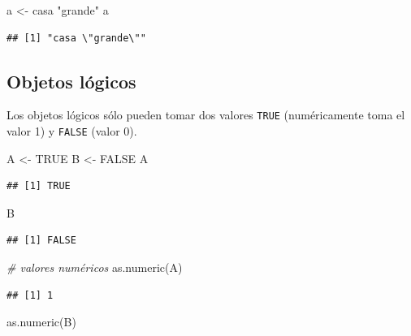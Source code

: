 \documentclass[
]{book}
\newenvironment{Shaded}{\begin{snugshade}}{\end{snugshade}}
\newcommand{\CommentTok}[1]{\textcolor[rgb]{0.56,0.35,0.01}{\textit{#1}}}
\newcommand{\ConstantTok}[1]{\textcolor[rgb]{0.00,0.00,0.00}{#1}}
\newcommand{\FunctionTok}[1]{\textcolor[rgb]{0.00,0.00,0.00}{#1}}
\newcommand{\NormalTok}[1]{#1}
\newcommand{\OtherTok}[1]{\textcolor[rgb]{0.56,0.35,0.01}{#1}}
\newcommand{\StringTok}[1]{\textcolor[rgb]{0.31,0.60,0.02}{#1}}
\theoremstyle{break}
\theoremstyle{nonumberplain}
\begin{document}
\begin{Shaded}
\begin{Highlighting}[]
\NormalTok{a }\OtherTok{\textless{}{-}} \StringTok{\textquotesingle{}casa "grande"\textquotesingle{}}
\NormalTok{a}
\end{Highlighting}
\end{Shaded}

\begin{verbatim}
## [1] "casa \"grande\""
\end{verbatim}

\hypertarget{objetos-luxf3gicos}{%
\subsection{Objetos lógicos}\label{objetos-luxf3gicos}}

Los objetos lógicos sólo pueden tomar dos valores \texttt{TRUE} (numéricamente toma el valor 1) y \texttt{FALSE}
(valor 0).

\begin{Shaded}
\begin{Highlighting}[]
\NormalTok{A }\OtherTok{\textless{}{-}} \ConstantTok{TRUE}
\NormalTok{B }\OtherTok{\textless{}{-}} \ConstantTok{FALSE}
\NormalTok{A}
\end{Highlighting}
\end{Shaded}

\begin{verbatim}
## [1] TRUE
\end{verbatim}

\begin{Shaded}
\begin{Highlighting}[]
\NormalTok{B}
\end{Highlighting}
\end{Shaded}

\begin{verbatim}
## [1] FALSE
\end{verbatim}

\begin{Shaded}
\begin{Highlighting}[]
\CommentTok{\# valores numéricos}
\FunctionTok{as.numeric}\NormalTok{(A)}
\end{Highlighting}
\end{Shaded}

\begin{verbatim}
## [1] 1
\end{verbatim}

\begin{Shaded}
\begin{Highlighting}[]
\FunctionTok{as.numeric}\NormalTok{(B)}
\end{Highlighting}
\end{Shaded}
\end{document}
